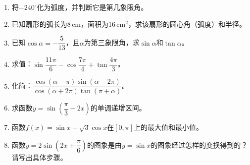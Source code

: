 \documentclass[12pt, a4paper]{ctexart}
\begin{document}
\begin{enumerate}[leftmargin=2em, label=\textbf{\arabic*.}]
  \item 将$-240^\circ$化为弧度，并判断它是第几象限角。

  \item 已知扇形的弧长为$8\,\text{cm}$，面积为$16\,\text{cm}^2$，求该扇形的圆心角（弧度）和半径。

  \item 已知$\cos\alpha=-\dfrac{5}{13}$，且$\alpha$为第三象限角，求$\sin\alpha$和$\tan\alpha$。

  \item 求值：$\sin\dfrac{11\pi}{6}-\cos\dfrac{7\pi}{4}+\tan\dfrac{4\pi}{3}$。

  \item 化简：$\dfrac{\cos(\alpha-\pi)\sin(\alpha-2\pi)}{\cos(\alpha+2\pi)\tan(\pi+\alpha)}$。

  \item 求函数$y=\sin\!\left(\dfrac{\pi}{3}-2x\right)$的单调递增区间。

  \item 函数$f(x)=\sin x-\sqrt{3}\cos x$在$\left[0,\pi\right]$上的最大值和最小值。

  \item 函数$y=2\sin\!\left(2x+\dfrac{\pi}{6}\right)$的图象是由$y=\sin x$的图象经过怎样的变换得到的？请写出具体步骤。
\end{enumerate}
\end{document}
